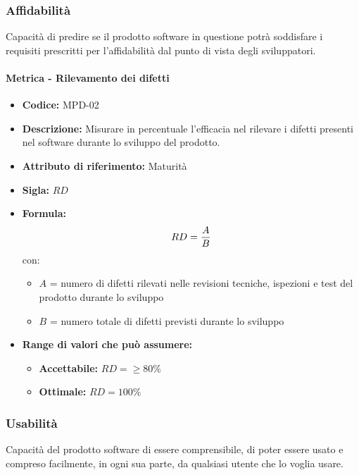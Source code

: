   \subsubsection{Affidabilità} 
  Capacità di predire se il prodotto software in questione potrà soddisfare i requisiti prescritti per l'affidabilità dal punto di vista degli sviluppatori.
        \paragraph{Metrica - Rilevamento dei difetti} 
                \begin{itemize}
        \item   \textbf{Codice:} MPD-02
        \item   \textbf{Descrizione:} Misurare in percentuale l'efficacia nel rilevare i difetti presenti nel software durante lo sviluppo del prodotto.
    \item    \textbf{Attributo di riferimento:} Maturità
    \item    \textbf{Sigla:} $RD$
    \item    \textbf{Formula:} $$RD = {A \over B}$$
            con:
            \begin{itemize}
                \item $A$ = numero di difetti rilevati nelle revisioni tecniche, ispezioni e test del prodotto durante lo sviluppo
                \item $B$ = numero totale di difetti previsti durante lo sviluppo
            \end{itemize}
             
             \item \textbf{Range di valori che può assumere:}
        \begin{itemize}
            \item \textbf{Accettabile:} $RD = \geq80\% $
            \item \textbf{Ottimale:} $RD = 100\%$
        \end{itemize}
       \end{itemize}
              
      
\subsubsection{Usabilità} 
Capacità del prodotto software di essere comprensibile, di poter essere usato e compreso facilmente, in ogni sua parte, da qualsiasi utente che lo voglia usare. \\

